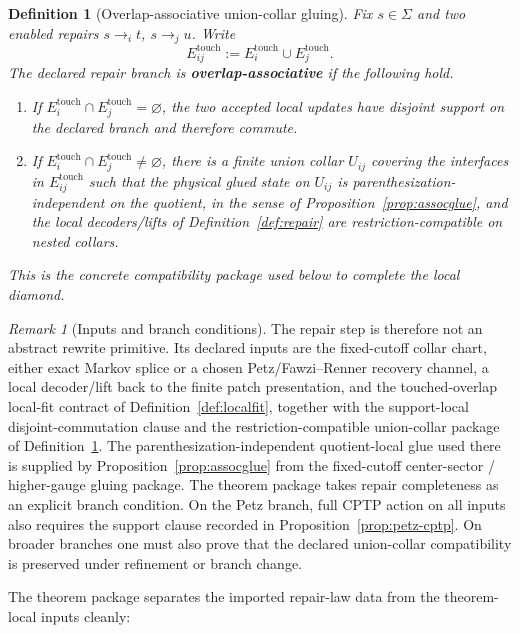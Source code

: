 \documentclass[11pt]{article}
\newtheorem{definition}[theorem]{Definition}
\theoremstyle{remark}
\newtheorem{remark}[theorem]{Remark}
\theoremstyle{plain}
\begin{document}
\begin{definition}[Overlap-associative union-collar gluing]\label{def:assoc}
Fix \(s\in\Sigma\) and two enabled repairs \(s\to_i t\), \(s\to_j u\). Write
\[
E_{ij}^{\mathrm{touch}}
:=
E_i^{\mathrm{touch}}\cup E_j^{\mathrm{touch}}.
\]
The declared repair branch is \textbf{overlap-associative} if the following hold.
\begin{enumerate}[label=(\roman*),leftmargin=2em]
\item If \(E_i^{\mathrm{touch}}\cap E_j^{\mathrm{touch}}=\varnothing\), the two accepted local
updates have disjoint support on the declared branch and therefore commute.
\item If \(E_i^{\mathrm{touch}}\cap E_j^{\mathrm{touch}}\neq\varnothing\), there is a finite union
collar \(U_{ij}\) covering the interfaces in \(E_{ij}^{\mathrm{touch}}\) such that the physical
glued state on \(U_{ij}\) is parenthesization-independent on the quotient, in the sense of
Proposition~\ref{prop:assocglue}, and the local decoders/lifts of
Definition~\ref{def:repair} are restriction-compatible on nested collars.
\end{enumerate}
This is the concrete compatibility package used below to complete the local diamond.
\end{definition}

\begin{remark}[Inputs and branch conditions]\label{rem:repair-burdens}
The repair step is therefore not an abstract rewrite primitive. Its declared inputs are the
fixed-cutoff collar chart, either exact Markov splice or a chosen Petz/Fawzi--Renner recovery
channel, a local decoder/lift back to the finite patch presentation, and the touched-overlap
local-fit contract of Definition~\ref{def:localfit}, together with the support-local
disjoint-commutation clause and the restriction-compatible union-collar package of
Definition~\ref{def:assoc}. The
parenthesization-independent quotient-local glue used there is supplied by
Proposition~\ref{prop:assocglue} from the fixed-cutoff center-sector / higher-gauge gluing
package. The theorem package takes repair completeness as an explicit branch condition.
On the Petz branch, full CPTP action on all inputs also requires the support clause
recorded in Proposition~\ref{prop:petz-cptp}. On broader branches one must also prove that
the declared union-collar compatibility is preserved under refinement or branch change.
\end{remark}

The theorem package separates the imported repair-law data from the theorem-local inputs cleanly:
\end{document}
